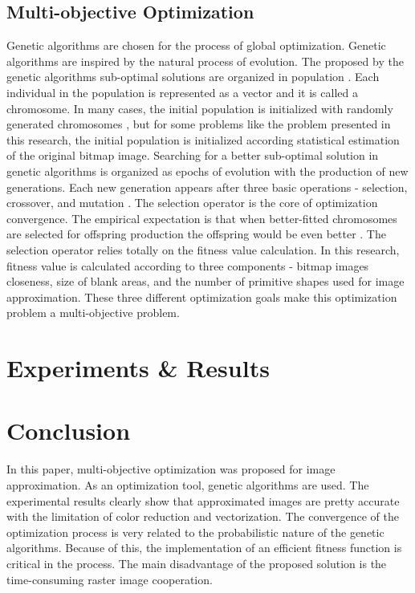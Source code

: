 \documentclass[conference]{IEEEtran}
\begin{document}
\subsection{Multi-objective Optimization}

Genetic algorithms are chosen for the process of global optimization. Genetic algorithms are inspired by the natural process of evolution. The proposed by the genetic algorithms sub-optimal solutions are organized in population \cite{Balabanov-Sevova-Kolev-2019}. Each individual in the population is represented as a vector and it is called a chromosome. In many cases, the initial population is initialized with randomly generated chromosomes \cite{Balabanov-Barova-Keremedchiev-2016}, but for some problems like the problem presented in this research, the initial population is initialized according statistical estimation of the original bitmap image. Searching for a better sub-optimal solution in genetic algorithms is organized as epochs of evolution with the production of new generations. Each new generation appears after three basic operations - selection, crossover, and mutation \cite{Balabanov-Zankinski-Barova-2016}. The selection operator is the core of optimization convergence. The empirical expectation is that when better-fitted chromosomes are selected for offspring production the offspring would be even better \cite{Balabanov-Zankinski-Dobrinkova-2011}. The selection operator relies totally on the fitness value calculation. In this research, fitness value is calculated according to three components - bitmap images closeness, size of blank areas, and the number of primitive shapes used for image approximation. These three different optimization goals make this optimization problem a multi-objective problem.  

\section{Experiments \& Results}

\section{Conclusion}

In this paper, multi-objective optimization was proposed for image approximation. As an optimization tool, genetic algorithms are used. The experimental results clearly show that approximated images are pretty accurate with the limitation of color reduction and vectorization. The convergence of the optimization process is very related to the probabilistic nature of the genetic algorithms. Because of this, the implementation of an efficient fitness function is critical in the process. The main disadvantage of the proposed solution is the time-consuming raster image cooperation. 
\end{document}

